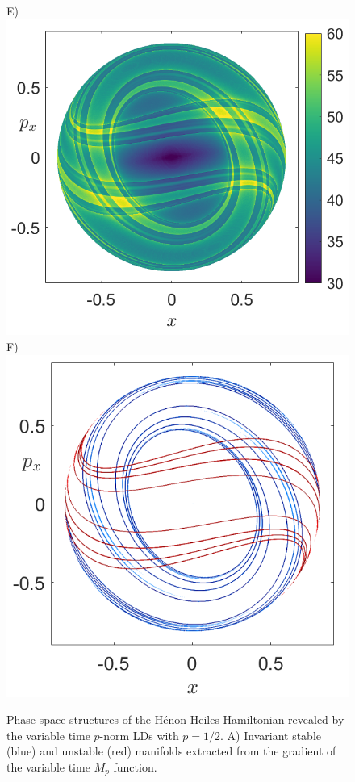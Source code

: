 \documentclass[8pt]{article}
\begin{document}
\begin{figure}[htbp]
\begin{center}
		E)\includegraphics[scale=0.36]{LDs_Henon_tau_10_y_0_E_1div3.png}
		F)\includegraphics[scale=0.36]{Mani_Henon_tau_10_y_0_E_1div3.png}
	\end{center}
	\caption{Phase space structures of the H\'enon-Heiles Hamiltonian revealed by the variable time $p$-norm LDs with $p = 1/2$. A) Invariant stable (blue) and unstable (red) manifolds extracted from the gradient of the variable time $M_p$ function.}
	\label{henonHeiles_lds}
\end{figure}
\end{document}
